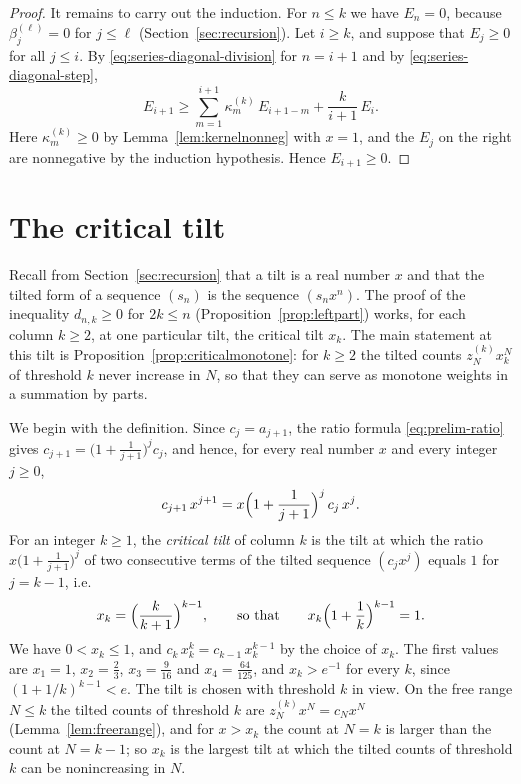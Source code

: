 \documentclass{amsart}
\theoremstyle{definition}
\theoremstyle{remark}
\numberwithin{equation}{section}
\begin{document}
\begin{proof}
It remains to carry out the induction. For $n\le k$ we have $E_n=0$, because $\beta^{(\ell)}_j=0$ for $j\le\ell$ (Section~\ref{sec:recursion}). Let $i\ge k$, and suppose that $E_j\ge 0$ for all $j\le i$. By \eqref{eq:series-diagonal-division} for $n=i+1$ and by \eqref{eq:series-diagonal-step},
\[
E_{i+1}\ge\sum_{m=1}^{i+1}\kappa^{(k)}_m\,E_{i+1-m}+\frac{k}{i+1}\,E_i .
\]
Here $\kappa^{(k)}_m\ge 0$ by Lemma~\ref{lem:kernelnonneg} with $x=1$, and the $E_j$ on the right are nonnegative by the induction hypothesis. Hence $E_{i+1}\ge 0$.
\end{proof}

\section{The critical tilt}\label{sec:critical}
Recall from Section~\ref{sec:recursion} that a tilt is a real number $x$ and that the tilted form of a sequence $(s_n)$ is the sequence $(s_nx^n)$. The proof of the inequality $d_{n,k}\ge 0$ for $2k\le n$ (Proposition~\ref{prop:leftpart}) works, for each column $k\ge 2$, at one particular tilt, the critical tilt $x_k$. The main statement at this tilt is Proposition~\ref{prop:criticalmonotone}: for $k\ge 2$ the tilted counts $z^{(k)}_Nx_k^N$ of threshold $k$ never increase in $N$, so that they can serve as monotone weights in a summation by parts.

We begin with the definition. Since $c_j=a_{j+1}$, the ratio formula \eqref{eq:prelim-ratio} gives $c_{j+1}=\bigl(1+\frac1{j+1}\bigr)^{j}c_j$, and hence, for every real number $x$ and every integer $j\ge 0$,
\begin{equation}\label{eq:critical-ratio}
c_{j+1}\,x^{j+1}=x\Bigl(1+\frac{1}{j+1}\Bigr)^{j}\,c_j\,x^{j}.
\end{equation}
For an integer $k\ge 1$, the \emph{critical tilt} of column $k$ is the tilt at which the ratio $x\bigl(1+\frac1{j+1}\bigr)^{j}$ of two consecutive terms of the tilted sequence $(c_jx^j)$ equals $1$ for $j=k-1$, i.e.
\[
x_k=\Bigl(\frac{k}{k+1}\Bigr)^{k-1},\qquad\text{so that}\qquad x_k\Bigl(1+\frac1k\Bigr)^{k-1}=1.
\]
We have $0<x_k\le 1$, and $c_k\,x_k^{k}=c_{k-1}\,x_k^{k-1}$ by the choice of $x_k$. The first values are $x_1=1$, $x_2=\frac23$, $x_3=\frac{9}{16}$ and $x_4=\frac{64}{125}$, and $x_k>e^{-1}$ for every $k$, since $(1+1/k)^{k-1}<e$. The tilt is chosen with threshold $k$ in view. On the free range $N\le k$ the tilted counts of threshold $k$ are $z^{(k)}_Nx^N=c_Nx^N$ (Lemma~\ref{lem:freerange}), and for $x>x_k$ the count at $N=k$ is larger than the count at $N=k-1$; so $x_k$ is the largest tilt at which the tilted counts of threshold $k$ can be nonincreasing in $N$.
\end{document}
